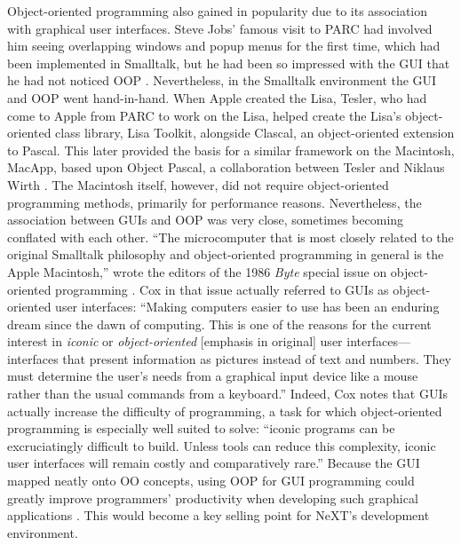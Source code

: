 \documentclass[acmsmall]{acmart}\settopmatter{}
\begin{document}
Object-oriented programming also gained in popularity due to its association with graphical user interfaces. Steve Jobs' famous visit to PARC had involved him seeing overlapping windows and popup menus for the first time, which had been implemented in Smalltalk, but he had been so impressed with the GUI that he had not noticed OOP \citetext{\citealp[330]{hiltzik_dealers_1999};  }. Nevertheless, in the Smalltalk environment the GUI and OOP went hand-in-hand. When Apple created the Lisa, Tesler, who had come to Apple from PARC to work on the Lisa, helped create the Lisa's object-oriented class library, Lisa Toolkit, alongside Clascal, an object-oriented extension to Pascal. This later provided the basis for a similar framework on the Macintosh, MacApp, based upon Object Pascal, a collaboration between Tesler and Niklaus Wirth \citetext{\citealp{schmucker_object-oriented_1986,schmucker_macapp:_1986}, \citealp[42--45]{tesler_oral_2016}}. The Macintosh itself, however, did not require object-oriented programming methods, primarily for performance reasons. Nevertheless, the association between GUIs and OOP was very close, sometimes becoming conflated with each other. ``The microcomputer that is most closely related to the original Smalltalk philosophy and object-oriented programming in general is the Apple Macintosh,'' wrote the editors of the 1986 \emph{Byte} special issue on object-oriented programming \citep[137]{white_object-oriented_1986}. Cox in that issue actually referred to GUIs as object-oriented user interfaces: ``Making computers easier to use has been an enduring dream since the dawn of computing. This is one of the reasons for the current interest in \emph{iconic} or \emph{object-oriented} [emphasis in original] user interfaces---interfaces that present information as pictures instead of text and numbers.\textellipsis{} They must determine the user's needs from a graphical input device like a mouse rather than the usual commands from a keyboard.'' Indeed, Cox notes that GUIs actually increase the difficulty of programming, a task for which object-oriented programming is especially well suited to solve: ``\textellipsis{}iconic programs can be excruciatingly difficult to build.\textellipsis{} Unless tools can reduce this complexity, iconic user interfaces will remain costly and comparatively rare.'' \citep[161]{cox_objects_1986} Because the GUI mapped neatly onto OO concepts, using OOP for GUI programming could greatly improve programmers' productivity when developing such graphical applications \citep{schmucker_object-oriented_1986,schmucker_macapp:_1986,tesler_programming_1986}. This would become a key selling point for NeXT's development environment.
\end{document}
